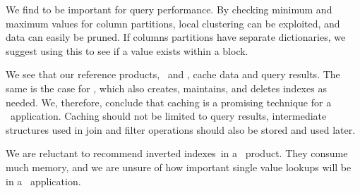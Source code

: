 We find  to be important for query performance. By checking minimum and maximum values for column partitions, local clustering can be exploited, and data can easily be pruned. If columns partitions have separate dictionaries, we suggest using this to see if a value exists within a block.

We see that our reference products, \qlikview~and \tableau, cache data and query results. The same is the case for \exasol, which also creates, maintains, and deletes indexes as needed. We, therefore, conclude that caching is a promising technique for a \bd~application. Caching should not be limited to query results, intermediate structures used in join and filter operations should also be stored and used later.

We are reluctant to recommend inverted indexes~in a \bd~product. They consume much memory, and we are unsure of how important single value lookups will be in a \bd~application.

